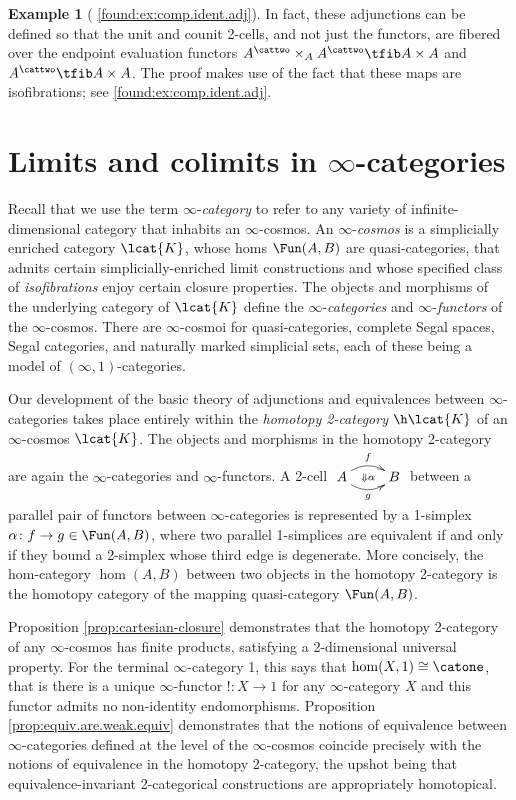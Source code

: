 \documentclass[12pt,reqno]{amsart}
\theoremstyle{plain}
\theoremstyle{definition}
\newtheorem{ex}[thm]{Example}
\theoremstyle{remark}
\numberwithin{equation}{subsection}
\newcommand{\extRef}[3]{%
  {\protect\IfBeginWith{#3}{itm:}{}{#2.}}\ref*{#1:#3}}
\newcommand{\refI}{\extRef{found}{I}}
\begin{document}
\begin{ex}[{\refI{ex:comp.ident.adj}}]
In fact, these adjunctions can be defined so that the unit and counit 2-cells, and not just the functors, are fibered over the endpoint evaluation functors $A^\cattwo\times_AA^\cattwo \tfib A \times A$ and $A^\cattwo \tfib A \times A$. The proof makes use of the fact that these maps are isofibrations; see \refI{ex:comp.ident.adj}.
\end{ex}





\renewcommand\thesection{\bf Lecture~\arabic{section}}
\section{Limits and colimits in \texorpdfstring{$\infty$}{infinity}-categories}\label{sec:limits}
\renewcommand\thesection{\arabic{section}}


Recall that we use the term $\infty$-\emph{category} to refer to any variety of infinite-dimensional category that inhabits an $\infty$-cosmos.  An $\infty$-\emph{cosmos} is a simplicially enriched category $\lcat{K}$, whose homs $\Fun(A,B)$ are quasi-categories, that admits certain simplicially-enriched limit constructions and whose specified class of \emph{isofibrations} enjoy certain closure properties. The objects and morphisms of the underlying category of $\lcat{K}$ define the $\infty$-\emph{categories} and $\infty$-\emph{functors} of the $\infty$-cosmos. There are $\infty$-cosmoi for quasi-categories, complete Segal spaces, Segal categories, and naturally marked simplicial sets, each of these being a model of $(\infty,1)$-categories.

Our development of the basic theory of adjunctions and equivalences between $\infty$-cat\-e\-gor\-ies takes place entirely within the \emph{homotopy 2-category} $\h\lcat{K}$ of an $\infty$-cosmos $\lcat{K}$. The objects and morphisms in the homotopy 2-category are again the $\infty$-categories and $\infty$-functors. A 2-cell $\xymatrix{ A \ar@/^2ex/[r]^f \ar@/_2ex/[r]_{g} \ar@{}[r]|{\Downarrow \alpha} &B}$ between a parallel pair of functors between $\infty$-categories is represented by a 1-simplex $\alpha \colon f \to g \in \Fun(A,B)$, where two parallel 1-simplices are equivalent if and only if they bound a 2-simplex whose third edge is degenerate. More concisely, the hom-category $\hom(A,B)$ between two objects in the homotopy 2-category is the homotopy category of the mapping quasi-category $\Fun(A,B)$.

Proposition \ref{prop:cartesian-closure} demonstrates that the homotopy 2-category of any $\infty$-cosmos has finite products, satisfying a 2-dimensional universal property. For the terminal $\infty$-category 1, this says that $\hom(X,1) \cong \catone$, that is there is a unique $\infty$-functor $! \colon X \to 1$ for any $\infty$-category $X$ and this functor admits no non-identity endomorphisms.  Proposition \ref{prop:equiv.are.weak.equiv} demonstrates that the notions of equivalence between $\infty$-categories defined at the level of the $\infty$-cosmos coincide precisely with the notions of equivalence in the homotopy 2-category, the upshot being that equivalence-invariant 2-categorical constructions are appropriately homotopical.
\end{document}
